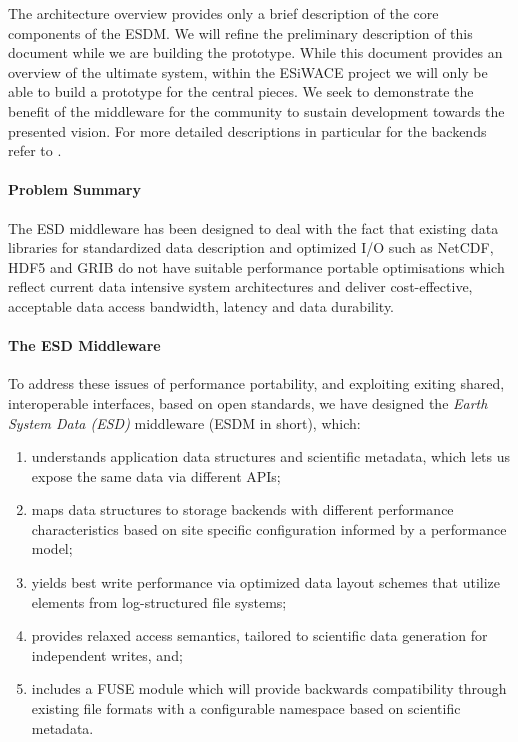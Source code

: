 The architecture overview provides only a brief description of the core components of the ESDM.
We will refine the preliminary description of this document while we are building the prototype.
While this document provides an overview of the ultimate system, within the ESiWACE project we will only be able to build a prototype for the central pieces.
We seek to demonstrate the benefit of the middleware for the community to sustain development towards the presented vision.
For more detailed descriptions in particular for the backends refer to .

\paragraph {Problem Summary}
The ESD middleware has been designed to deal with the fact that existing  data
libraries for standardized data description and optimized I/O such as NetCDF,
HDF5 and GRIB do not have suitable performance portable optimisations which
reflect current data intensive system architectures and deliver cost-effective,
acceptable data access bandwidth, latency and data durability.

\paragraph {The ESD Middleware}
To address these issues of performance portability, and exploiting exiting shared, interoperable interfaces, based on open standards, we have designed the \textit{Earth System Data (ESD)} middleware (ESDM in short), which:
\begin{enumerate}
	\item understands application data structures and scientific metadata, which lets us expose the same data via different APIs;
	\item maps data structures to storage backends with different performance characteristics based on site specific configuration informed by a performance model;
	\item yields best write performance via optimized data layout schemes that utilize elements from log-structured file systems;
	\item provides relaxed access semantics, tailored to scientific data generation for independent writes, and;
	\item includes a FUSE module which will provide backwards compatibility through existing file formats with a configurable namespace based on scientific metadata.
\end{enumerate}

